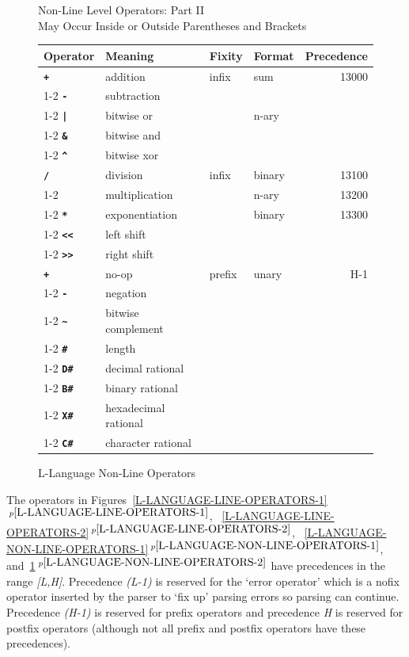 \documentclass[12pt]{article}
\newcommand{\ttkey}[1]{{\tt \bfseries #1}}
\newcommand{\itemref}[1]{\ref{#1}$\,^{p\pageref{#1}}$}
\newlength{\figurewidth}
\newenvironment{boxedfigure}[1][!btp]%
	{\begin{figure}[#1]
	 \begin{lrbox}{\figurebox}
	 \begin{minipage}{\figurewidth}

	 \vspace*{1ex}}%
	{
	 \vspace*{1ex}

	 \end{minipage}
	 \end{lrbox}

	 \centering
	 \fbox{\hspace*{0.1in}\usebox{\figurebox}\hspace*{0.1in}}
	 \end{figure}}
\begin{document}
\begin{boxedfigure}[!t]
\begin{center}
Non-Line Level Operators: Part II \\
May Occur Inside or Outside Parentheses and Brackets
\\[1ex]
\begin{tabular}{|l|l|l|l|r|}
\hline
Operator & Meaning & Fixity & Format & Precedence \\
\hline
\ttkey{+}  & addition & infix & sum & 13000
\\\cline{1-2}
\ttkey{-}  & subtraction & & &
\\\cline{1-2}\cline{4-4}
\ttkey{|}  & bitwise or & & n-ary &
\\\cline{1-2}
\ttkey{\&}  & bitwise and & & &
\\\cline{1-2}
\ttkey{\textasciicircum}  & bitwise xor & & &
\\\hline
\ttkey{/}  & division & infix & binary & 13100
\\\cline{1-2}\cline{4-5}
\ttkey{*}  & multiplication & & n-ary & 13200
\\\cline{1-2}\cline{4-5}
\ttkey{**}  & exponentiation & & binary & 13300
\\\cline{1-2}
\ttkey{<{}<}  & left shift & & &
\\\cline{1-2}
\ttkey{>{}>}  & right shift & & &
\\\hline
\ttkey{+}  & no-op & prefix & unary & H-1
\\\cline{1-2}
\ttkey{-}  & negation & & &
\\\cline{1-2}
\ttkey{\textasciitilde}  & bitwise complement & & &
\\\cline{1-2}
\ttkey{\#}  & length & & &
\\\cline{1-2}
\ttkey{D\#}  & decimal rational & & &
\\\cline{1-2}
\ttkey{B\#}  & binary rational & & &
\\\cline{1-2}
\ttkey{X\#}  & hexadecimal rational & & &
\\\cline{1-2}
\ttkey{C\#}  & character rational & & &
\\\hline

\end{tabular}
\end{center}

\caption{L-Language Non-Line Operators}
\label{L-LANGUAGE-NON-LINE-OPERATORS-2}
\end{boxedfigure}

The operators in
Figures~\itemref{L-LANGUAGE-LINE-OPERATORS-1},
~\itemref{L-LANGUAGE-LINE-OPERATORS-2},
~\itemref{L-LANGUAGE-NON-LINE-OPERATORS-1},
and~\itemref{L-LANGUAGE-NON-LINE-OPERATORS-2}
have precedences in
the range {\em [L,H]}.
Precedence {\em (L-1)} is reserved for the `error operator' which is a
nofix operator inserted by the parser to `fix up' parsing errors
so parsing can continue.  Precedence {\em (H-1)} is reserved for prefix
operators and precedence {\em H} is reserved for postfix operators
(although not all prefix and postfix operators have these precedences).
\end{document}
